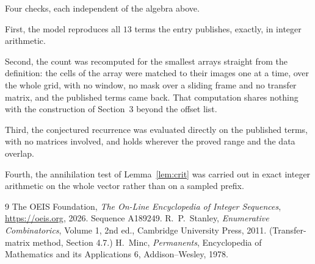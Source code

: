\documentclass[11pt,a4paper]{article}
\theoremstyle{plain}
\theoremstyle{definition}
\begin{document}
Four checks, each independent of the algebra above.

First, the model reproduces all $13$ terms the entry publishes, exactly, in integer
arithmetic.

Second, the count was recomputed for the smallest arrays straight from the definition: the
cells of the array were matched to their images one at a time, over the whole grid, with no
window, no mask over a sliding frame and no transfer matrix, and the published terms came back.
That computation shares nothing with the construction of Section~3 beyond the offset list.

Third, the conjectured recurrence was evaluated directly on the published terms, with no
matrices involved, and holds wherever the proved range and the data overlap.

Fourth, the annihilation test of Lemma~\ref{lem:crit} was carried out in exact integer
arithmetic on the whole vector rather than on a sampled prefix.

\begin{thebibliography}{9}
 The OEIS Foundation, \emph{The On-Line Encyclopedia of Integer
Sequences}, \url{https://oeis.org}, 2026. Sequence A189249.
 R.~P.~Stanley, \emph{Enumerative Combinatorics}, Volume 1, 2nd ed.,
Cambridge University Press, 2011. (Transfer-matrix method, Section 4.7.)
 H.~Minc, \emph{Permanents}, Encyclopedia of Mathematics and its
Applications 6, Addison--Wesley, 1978.
\end{thebibliography}
\end{document}
